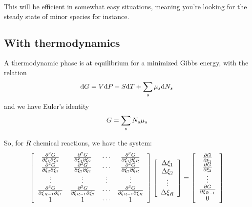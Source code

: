 This will be efficient in somewhat easy situations, meaning you're looking for the
steady state of minor species for instance.

\subsection{With thermodynamics}
A thermodynamic phase is at equilibrium for a minimized Gibbs energy, with
the relation
\begin{equation}
\dd\Gibbs = \Vol\dd\Press - \Entr\dd\Temp + \sum_s\chempot[s]\dd\Mol[s]
\end{equation}
and we have Euler's identity
\begin{equation}
\Gibbs = \sum_s \Mol[s]\chempot[s]
\end{equation}

So, for $R$ chemical reactions, we have the system:
\begin{equation}
\left[\begin{array}{cccc}
\ddoverddext{\Gibbs}{1}{1}   & \ddoverddext{\Gibbs}{1}{2}   & \cdots & \ddoverddext{\Gibbs}{1}{R} \\
\ddoverddext{\Gibbs}{2}{1}   & \ddoverddext{\Gibbs}{2}{2}   & \cdots & \ddoverddext{\Gibbs}{2}{R} \\
\vdots                       & \vdots                       & \vdots & \vdots                    \\
\ddoverddext{\Gibbs}{R-1}{1} & \ddoverddext{\Gibbs}{R-1}{2} & \cdots & \ddoverddext{\Gibbs}{R-1}{R} \\
1                            & 1                            & \cdots & 1\\
\end{array}\right]
\left[\begin{array}{c}
\Delta\ext[1]\\
\Delta\ext[2]\\
\vdots\\
\Delta\ext[R]\\
\end{array}\right]
=
\left[\begin{array}{c}
\doverdext[1]{\Gibbs}\\
\doverdext[2]{\Gibbs}\\
\vdots\\
\doverdext[R-1]{\Gibbs}\\
0
\end{array}\right]
\label{eq:matrixes_xi}
\end{equation}

